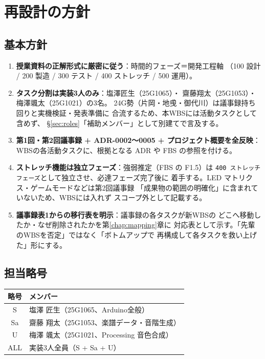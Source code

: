 \documentclass[lualatex,book,paper=a4paper,jafontsize=11pt,jafontscale=1.05]{jlreq}
\begin{document}
\chapter{再設計の方針}

\section{基本方針}

\begin{enumerate}
  \item \textbf{授業資料の正解形式に厳密に従う}：時間的フェーズ＝開発工程軸
        （100 設計 / 200 製造 / 300 テスト / 400 ストレッチ / 500 運用）。
  \item \textbf{タスク分割は実装3人のみ}：塩澤匠生（25G1065）・
        齋藤翔太（25G1053）・梅澤颯太（25G1021）の3名。
        24G勢（片岡・地曵・御代川）は議事録持ち回りと実機検証・発表準備に
        合流するため、本WBSには活動タスクとして含めず、
        §\ref{sec:roles}「補助メンバー」として別建てで言及する。
  \item \textbf{第1回・第2回議事録 + ADR-0002〜0005 + プロジェクト概要を全反映}：
        WBSの各活動タスクに、根拠となる ADR や FBS の参照を付ける。
  \item \textbf{ストレッチ機能は独立フェーズ}：強弱推定（FBS の F1.5）は
        \texttt{400 ストレッチフェーズ}として独立させ、必達フェーズ完了後に
        着手する。LED マトリクス・ゲームモードなどは第2回議事録
        「成果物の範囲の明確化」に含まれていないため、WBSには入れず
        スコープ外として記載する。
  \item \textbf{議事録表1からの移行表を明示}：議事録の各タスクが新WBSの
        どこへ移動したか・なぜ削除されたかを第\ref{chap:mapping}章に
        対応表として示す。「先輩のWBSを否定」ではなく「ボトムアップで
        再構成して各タスクを救い上げた」形にする。
\end{enumerate}

\section{担当略号}

\begin{center}
\begin{tabular}{cl}
\toprule
\textbf{略号} & \textbf{メンバー} \\
\midrule
S   & 塩澤 匠生（25G1065、Arduino全般） \\
Sa  & 齋藤 翔太（25G1053、楽譜データ・音階生成） \\
U   & 梅澤 颯太（25G1021、Processing 音色合成） \\
ALL & 実装3人全員（S + Sa + U） \\
\bottomrule
\end{tabular}
\end{center}
\end{document}
